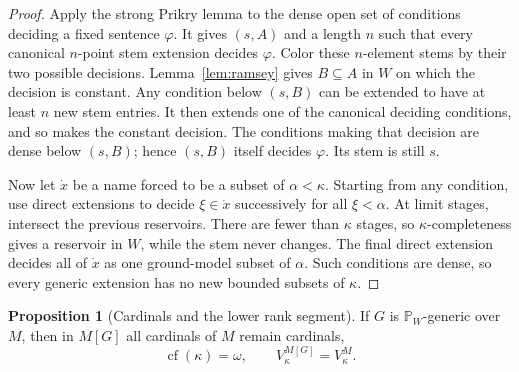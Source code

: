 \documentclass[11pt,letterpaper]{article}
\theoremstyle{definition}
\newtheorem{proposition}[definition]{Proposition}
\numberwithin{equation}{section}
\newcommand{\cf}{\operatorname{cf}}
\newcommand{\PP}{\mathbb P}
\begin{document}
\begin{proof}
Apply the strong Prikry lemma to the dense open set of conditions
deciding a fixed sentence $\varphi$. It gives $(s,A)$ and a length $n$
such that every canonical $n$-point stem extension decides
$\varphi$. Color these $n$-element stems by their two possible
decisions. Lemma~\ref{lem:ramsey} gives $B\subseteq A$ in $W$ on which
the decision is constant. Any condition below $(s,B)$ can be extended
to have at least $n$ new stem entries. It then extends one of the
canonical deciding conditions, and so makes the constant decision.
The conditions making that decision are dense below $(s,B)$; hence
$(s,B)$ itself decides $\varphi$. Its stem is still $s$.

Now let $\dot x$ be a name forced to be a subset of $\alpha<\kappa$.
Starting from any condition, use direct extensions to decide
$\xi\in\dot x$ successively for all $\xi<\alpha$. At limit stages,
intersect the previous reservoirs. There are fewer than $\kappa$
stages, so $\kappa$-completeness gives a reservoir in $W$, while the
stem never changes. The final direct extension decides all of
$\dot x$ as one ground-model subset of $\alpha$. Such conditions are
dense, so every generic extension has no new bounded subsets of
$\kappa$.
\end{proof}

\begin{proposition}[Cardinals and the lower rank segment]\label{prop:preservation}
If $G$ is $\PP_W$-generic over $M$, then in $M[G]$ all cardinals of
$M$ remain cardinals,
\[
 \cf(\kappa)=\omega,
 \qquad V_\kappa^{M[G]}=V_\kappa^M.
\]
\end{proposition}
\end{document}
